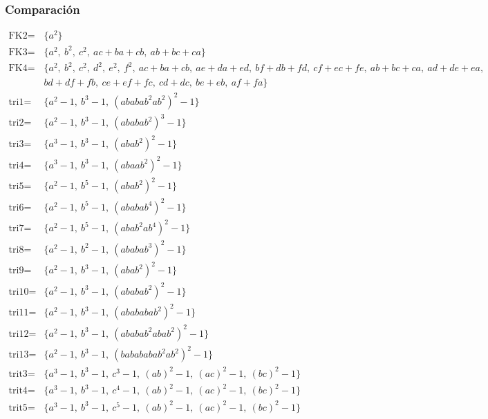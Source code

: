 \documentclass[spanish, aspectratio=169, hidecontrols]{beamer}
\begin{document}
\begin{frame}
  \frametitle{Comparación}
    \begin{tiny}
    \setlength{\jot}{0pt}
    \begin{align*}
      \text{FK2} =& \{a^2\} \\
      \text{FK3} =& \{a^2,\ b^2,\ c^2,\ ac + ba + cb,\ ab + bc + ca\} \\
      \text{FK4} =& \{a^2,\ b^2,\ c^2,\ d^2,\ e^2,\ f^2,\ ac + ba + cb,\ ae + da + ed,\ bf + db + fd,\ cf + ec + fe,\ ab + bc + ca,\ ad + de + ea, \\
        & bd + df + fb,\ ce + ef + fc,\ cd + dc,\ be + eb,\ af + fa\} \\
      \text{tri1} =& \{a^2 - 1,\ b^3 - 1,\ {(ababab^2ab^2)}^2 - 1\} \\
      \text{tri2} =& \{a^2 - 1,\ b^3 - 1,\ {(ababab^2)}^3 - 1\} \\
      \text{tri3} =& \{a^3 - 1,\ b^3 - 1,\ {(abab^2)}^2 - 1\} \\
      \text{tri4} =& \{a^3 - 1,\ b^3 - 1,\ {(abaab^2)}^2 - 1\} \\
      \text{tri5} =& \{a^2 - 1,\ b^5 - 1,\ {(abab^2)}^2 - 1\} \\
      \text{tri6} =& \{a^2 - 1,\ b^5 - 1,\ {(ababab^4)}^2 - 1\} \\
      \text{tri7} =& \{a^2 - 1,\ b^5 - 1,\ {(abab^2ab^4)}^2 - 1\} \\
      \text{tri8} =& \{a^2 - 1,\ b^2 - 1,\ {(ababab^3)}^2 - 1\} \\
      \text{tri9} =& \{a^2 - 1,\ b^3 - 1,\ {(abab^2)}^2 - 1\} \\
      \text{tri10} =& \{a^2 - 1,\ b^3 - 1,\ {(ababab^2)}^2 - 1\} \\
      \text{tri11} =& \{a^2 - 1,\ b^3 - 1,\ {(abababab^2)}^2 - 1\} \\
      \text{tri12} =& \{a^2 - 1,\ b^3 - 1,\ {(ababab^2abab^2)}^2 - 1\} \\
      \text{tri13} =& \{a^2 - 1,\ b^3 - 1,\ {(babababab^2ab^2)}^2 - 1\} \\
      \text{trit3} =& \{a^3 - 1,\ b^3 - 1,\ c^3 - 1,\ {(ab)}^2 - 1,\ {(ac)}^2 - 1,\ {(bc)}^2 - 1\} \\
      \text{trit4} =& \{a^3 - 1,\ b^3 - 1,\ c^4 - 1,\ {(ab)}^2 - 1,\ {(ac)}^2 - 1,\ {(bc)}^2 - 1\} \\
      \text{trit5} =& \{a^3 - 1,\ b^3 - 1,\ c^5 - 1,\ {(ab)}^2 - 1,\ {(ac)}^2 - 1,\ {(bc)}^2 - 1\}
    \end{align*}
    \end{tiny}
\end{frame}
\end{document}
